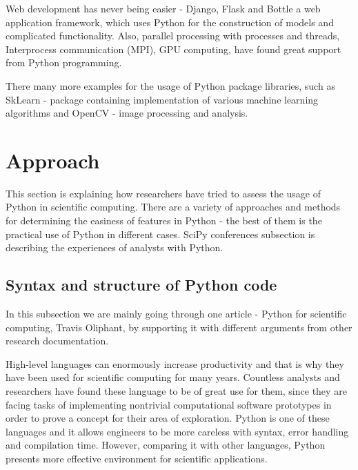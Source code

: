 \documentclass{article}
\begin{document}
Web development has never being easier - Django, Flask and Bottle a web application framework, which uses Python for the construction of models and complicated functionality. Also, parallel processing with processes and threads, Interprocess communication (MPI), GPU computing, have found great support from Python programming.

There many more examples for the usage of Python package libraries, such as SkLearn - package containing implementation of various machine learning algorithms and OpenCV - image processing and analysis. 

\section{Approach}
\label{approach}
This section is explaining how researchers have tried to assess the usage of Python in scientific computing. There are a variety of approaches and methods for determining the easiness of features in Python - the best of them is the practical use of Python in different cases. SciPy conferences subsection is describing the experiences of analysts with Python. 

\subsection{Syntax and structure of Python code} 
\label{syntax}

In this subsection we are mainly going through one article - Python for scientific computing, Travis Oliphant, by supporting it with different arguments from other research documentation. \cite{oliphant2007python}

High-level languages can enormously increase productivity and that is why they have been used for scientific computing for many years. Countless analysts and researchers have found these language to be of great use for them, since they are facing tasks of implementing nontrivial computational software prototypes in order to prove a concept for their area of exploration. Python is one of these languages and it allows engineers to be more careless with syntax, error handling and compilation time. However, comparing it with other languages, Python presents more effective environment for scientific applications.
\end{document}
